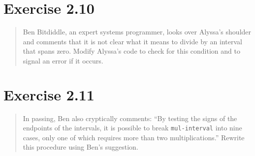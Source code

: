 \documentclass{article}
\begin{document}
\section{Exercise 2.10}
\begin{quote}
    Ben Bitdiddle, an expert systems programmer, looks over Alyssa's shoulder
    and comments that it is not clear what it means to divide by an interval
    that spans zero. Modify Alyssa's code to check for this condition and to
    signal an error if it occurs.
\end{quote}



\section{Exercise 2.11}
\begin{quote}
    In passing, Ben also cryptically comments: “By testing the signs of the
    endpoints of the intervals, it is possible to break \texttt{mul-interval}
    into nine cases, only one of which requires more than two multiplications.”
    Rewrite this procedure using Ben’s suggestion.
\end{quote}


\end{document}

